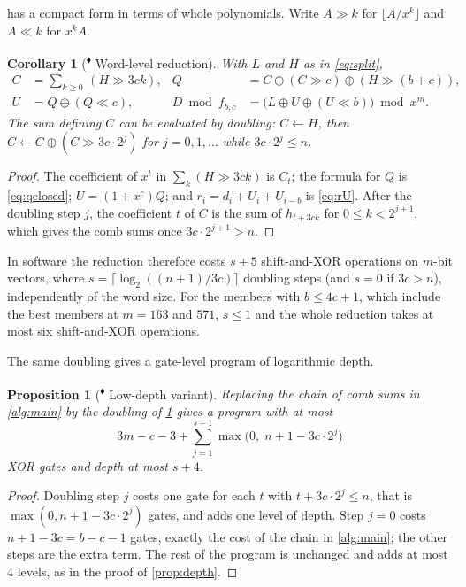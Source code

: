 \documentclass[11pt,a4paper]{article}
\theoremstyle{plain}
\newtheorem{proposition}[theorem]{Proposition}
\newtheorem{corollary}[theorem]{Corollary}
\theoremstyle{definition}
\newcommand{\xor}{\oplus}
\newcommand{\ours}{\textsuperscript{\textcolor{cblue}{$\blacklozenge$}}}
\begin{document}
 has a compact form in terms of whole polynomials. Write
$A\gg k$ for $\lfloor A/x^k\rfloor$ and $A\ll k$ for $x^kA$.

\begin{corollary}[\ours{} Word-level reduction]\label{cor:word}
With $L$ and $H$ as in \eqref{eq:split},
\begin{align*}
  C &=\textstyle\sum_{k\ge0}\,(H\gg 3ck), &
  Q &= C\xor (C\gg c)\xor (H\gg (b+c)),\\
  U &= Q\xor (Q\ll c), &
  D\bmod f_{b,c} &= \bigl(L\xor U\xor (U\ll b)\bigr)\bmod x^m .
\end{align*}
The sum defining $C$ can be evaluated by doubling: $C\gets H$, then
$C\gets C\xor(C\gg 3c\cdot2^j)$ for $j=0,1,\dots$ while $3c\cdot2^j\le n$.
\end{corollary}

\begin{proof}
The coefficient of $x^t$ in $\sum_k(H\gg3ck)$ is $C_t$; the formula for $Q$ is
\eqref{eq:qclosed}; $U=(1+x^c)Q$; and $r_i=d_i+U_i+U_{i-b}$ is \eqref{eq:rU}. After
the doubling step $j$, the coefficient $t$ of $C$ is the sum of $h_{t+3ck}$ for
$0\le k<2^{j+1}$, which gives the comb sums once $3c\cdot2^{j+1}>n$.
\end{proof}

In software the reduction therefore costs $s+5$ shift-and-XOR operations on
$m$-bit vectors, where $s=\lceil\log_2((n+1)/3c)\rceil$ doubling steps (and $s=0$ if
$3c>n$), independently of the word size. For the members with $b\le4c+1$, which include
the best members at $m=163$ and $571$, $s\le1$ and the whole reduction takes at most six
shift-and-XOR operations.

The same doubling gives a gate-level program of logarithmic depth.

\begin{proposition}[\ours{} Low-depth variant]\label{prop:lowdepth}
Replacing the chain of comb sums in \cref{alg:main} by the doubling of
\cref{cor:word} gives a program with at most
\[
  3m-c-3+\sum_{j=1}^{s-1}\max\bigl(0,\;n+1-3c\cdot2^{j}\bigr)
\]
XOR gates and depth at most $s+4$.
\end{proposition}

\begin{proof}
Doubling step $j$ costs one gate for each $t$ with $t+3c\cdot2^j\le n$, that is
$\max(0,n+1-3c\cdot2^j)$ gates, and adds one level of depth. Step $j=0$ costs
$n+1-3c=b-c-1$ gates, exactly the cost of the chain in \cref{alg:main}; the other steps
are the extra term. The rest of the program is unchanged and adds at most $4$ levels, as
in the proof of \cref{prop:depth}.
\end{proof}
\end{document}
